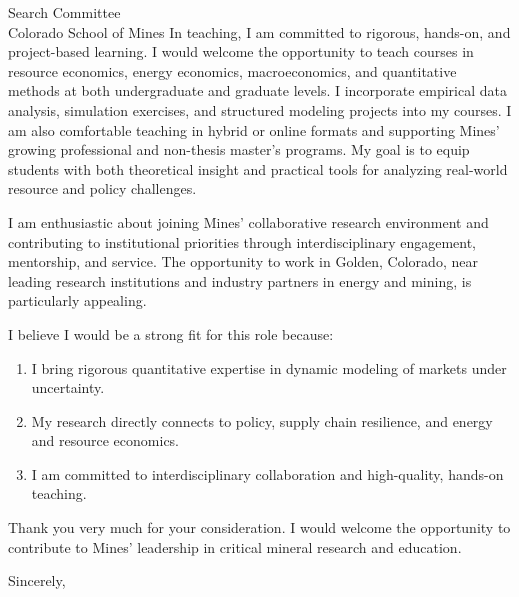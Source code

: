 \documentclass[11pt,letterpaper]{letter}
\begin{document}
\begin{letter}{
Search Committee \\
Colorado School of Mines
}
In teaching, I am committed to rigorous, hands-on, and project-based learning. I would welcome the opportunity to teach courses in resource economics, energy economics, macroeconomics, and quantitative methods at both undergraduate and graduate levels. I incorporate empirical data analysis, simulation exercises, and structured modeling projects into my courses. I am also comfortable teaching in hybrid or online formats and supporting Mines’ growing professional and non-thesis master’s programs. My goal is to equip students with both theoretical insight and practical tools for analyzing real-world resource and policy challenges.

I am enthusiastic about joining Mines’ collaborative research environment and contributing to institutional priorities through interdisciplinary engagement, mentorship, and service. The opportunity to work in Golden, Colorado, near leading research institutions and industry partners in energy and mining, is particularly appealing.

I believe I would be a strong fit for this role because:
\begin{enumerate}
    \item I bring rigorous quantitative expertise in dynamic modeling of markets under uncertainty.
    \item My research directly connects to policy, supply chain resilience, and energy and resource economics.
    \item I am committed to interdisciplinary collaboration and high-quality, hands-on teaching.
\end{enumerate}

Thank you very much for your consideration. I would welcome the opportunity to contribute to Mines’ leadership in critical mineral research and education.

\closing{Sincerely,}

\end{letter}
\end{document}
